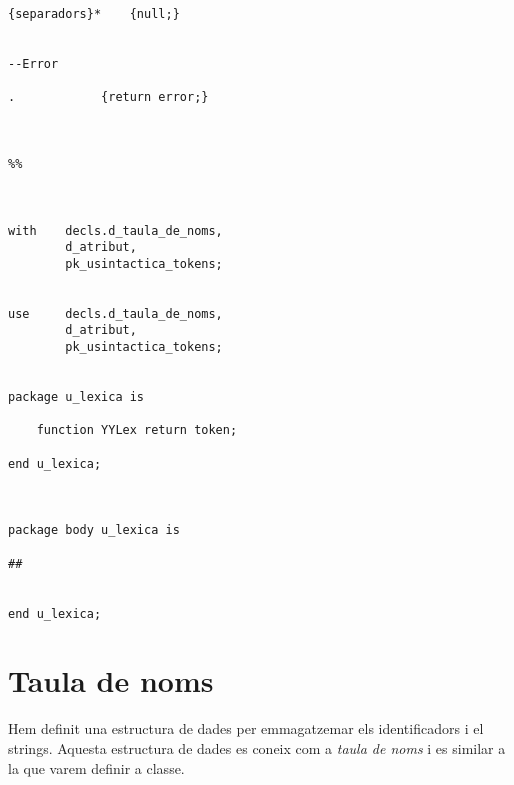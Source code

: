 \documentclass[10pt]{report}
\begin{document}
\begin{lstlisting}
{separadors}*    {null;}


--Error

.            {return error;}



%%



with    decls.d_taula_de_noms,
        d_atribut,
        pk_usintactica_tokens;
        

use     decls.d_taula_de_noms,
        d_atribut,
        pk_usintactica_tokens;


package u_lexica is

    function YYLex return token;
    
end u_lexica;



package body u_lexica is

##


end u_lexica;
    \end{lstlisting}
    
    \newpage
    \section{Taula de noms}
        Hem definit una estructura de dades per emmagatzemar els identificadors i el strings. Aquesta estructura de dades es coneix com a \textit{taula de noms} i es similar a la que varem definir a classe.
        
    
\end{document}
